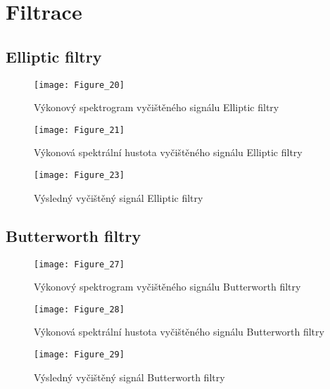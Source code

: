 \section{Filtrace}
\subsection{Elliptic filtry}
\begin{figure}[H] 
	\centering
	\texttt{[image: Figure\_20]}
	\caption{Výkonový spektrogram vyčištěného signálu Elliptic filtry}
\end{figure}

\begin{figure}[H] 
	\centering
	\texttt{[image: Figure\_21]}
	\caption{Výkonová spektrální hustota vyčištěného signálu Elliptic filtry}
\end{figure}

\begin{landscape}
\begin{figure}[H] 
	\centering
	\texttt{[image: Figure\_23]}
	\caption{Výsledný vyčištěný signál Elliptic filtry}
\end{figure}
\end{landscape}

\subsection{Butterworth filtry}
\begin{figure}[H] 
	\centering
	\texttt{[image: Figure\_27]}
	\caption{Výkonový spektrogram vyčištěného signálu Butterworth filtry}
\end{figure}

\begin{figure}[H] 
	\centering
	\texttt{[image: Figure\_28]}
	\caption{Výkonová spektrální hustota vyčištěného signálu Butterworth filtry}
\end{figure}

\begin{landscape}
\begin{figure}[H] 
	\centering
	\texttt{[image: Figure\_29]}
	\caption{Výsledný vyčištěný signál Butterworth filtry}
\end{figure}
\end{landscape}

